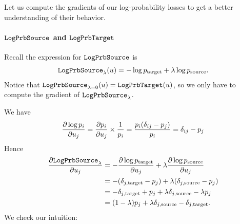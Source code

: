 \documentclass[../main.tex]{subfiles}
\begin{document}
Let us compute the gradients of our log-probability losses to get a better understanding of their behavior.

\paragraph{$\mathtt{LogPrbSource}_{}$ and $\mathtt{LogPrbTarget}$}

Recall the expression for $\mathtt{LogPrbSource}_{}$  is
\begin{align*}
    \mathtt{LogPrbSource}_{\lambda}(u) = - \log p_{\mathrm{target}} + \lambda \log p_{\mathrm{source}}.
\end{align*}
Notice that $\mathtt{LogPrbSource}_{\lambda=0}(u) = \mathtt{LogPrbTarget}(u)$, so we only have to compute the
gradient of $\mathtt{LogPrbSource}_{\lambda}$.

We have
\begin{align*}
    \frac{\partial \log p_i}{\partial u_j}
= \frac{\partial p_i}{\partial u_j} \times \frac{1}{p_i}
= \frac{p_i (\delta_{ij} - p_j) }{p_i}
= \delta_{ij} - p_j
\end{align*}
Hence
\begin{align*}
    \frac{\partial \mathtt{LogPrbSource}_{\lambda}}{\partial u_j}
     & = - \frac{\partial \log p_{\mathrm{target}}}{\partial u_j} + \lambda \frac{\partial \log p_{\mathrm{source}}}{\partial u_j} \\
     & = - (\delta_{j, \mathrm{target}} - p_j) + \lambda (\delta_{j, \mathrm{source}} - p_j)                             \\
     & = - \delta_{j, \mathrm{target}} + p_j + \lambda \delta_{j, \mathrm{source}} - \lambda p_j                         \\
     & = (1 - \lambda) p_j + \lambda \delta_{j, \mathrm{source}} - \delta_{j, \mathrm{target}}.
\end{align*}
We check our intuition:
\end{document}

